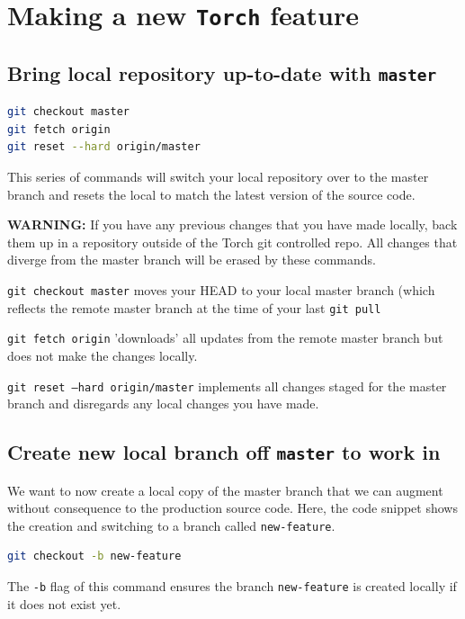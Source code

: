 \documentclass[10pt]{article}
\begin{document}
\section{Making a new \texttt{Torch} feature}

\subsection{Bring local repository up-to-date with \texttt{master}}
\begin{lstlisting}[language=bash]
git checkout master
git fetch origin
git reset --hard origin/master
\end{lstlisting}

This series of commands will switch your local repository over to the master branch and resets the local to match the latest version of the source code. 

\textbf{WARNING:} If you have any previous changes that you have made locally, back them up in a repository outside of the Torch git controlled repo. All changes that diverge from the master branch will be erased by these commands.

\texttt{git checkout master} moves your HEAD to your local master branch (which reflects the remote master branch at the time of your last \texttt{git pull}

\texttt{git fetch origin} 'downloads' all updates from the remote master branch but does not make the changes locally.

\texttt{git reset --hard origin/master} implements all changes staged for the master branch and disregards any local changes you have made.

\subsection{Create new local branch off \texttt{master} to work in}

We want to now create a local copy of the master branch that we can augment without consequence to the production source code. Here, the code snippet shows the creation and switching to a branch called \texttt{new-feature}.

\begin{lstlisting}[language=bash]
git checkout -b new-feature
\end{lstlisting}

The \texttt{-b} flag of this command ensures the branch \texttt{new-feature} is created locally if it does not exist yet.  
\end{document}
